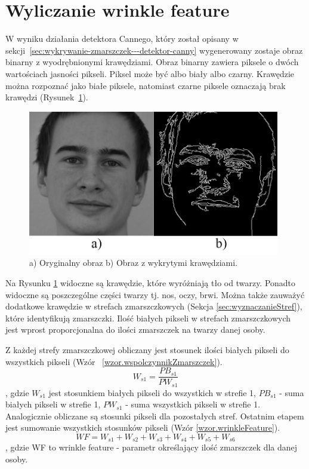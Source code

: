 \documentclass[a4paper,twoside,12pt]{book}
\begin{document}
    \section{Wyliczanie wrinkle feature}\label{sec:wyliczanieWrinkleFeature}
    W wyniku działania detektora Cannego, który został opisany w sekcji~\ref{sec:wykrywanie-zmarszczek---detektor-canny}
    wygenerowany zostaje obraz binarny z wyodrębnionymi krawędziami.
    Obraz binarny zawiera piksele o dwóch wartościach jasności pikseli.
    Piksel może być albo biały albo czarny.
    Krawędzie można rozpoznać jako białe piksele, natomiast czarne piksele oznaczają brak krawędzi (Rysunek~\ref{fig.mojaTwarzGray}).

    \begin{figure}
        \centering
        \includegraphics[width=11cm]{Obrazy/mojaTwarzGray.jpg}
        \caption{a) Oryginalny obraz b) Obraz z wykrytymi krawędziami.}
        \label{fig.mojaTwarzGray}
    \end{figure}

    Na Rysunku \ref{fig.mojaTwarzGray} widoczne są krawędzie, które wyróżniają tło od twarzy.
    Ponadto widoczne są poszczególne części twarzy tj. nos, oczy, brwi.
    Można także zauważyć dodatkowe krawędzie w strefach zmarszczkowych (Sekcja \ref{sec:wyznaczanieStref}),
    które identyfikują zmarszczki.
    Ilość białych pikseli w strefach zmarszczkowych jest wprost proporcjonalna do ilości zmarszczek na twarzy danej
    osoby.

    Z każdej strefy zmarszczkowej obliczany jest stosunek ilości białych pikseli do wszystkich
    pikseli (Wzór ~\ref{wzor.wspolczynnikZmarszczek}).
    \large
    \begin{equation}
        W_{s1} = \frac{PB_{s1}}{PW_{s1}}
        \label{wzor.wspolczynnikZmarszczek}
    \end{equation}
    \normalsize
    , gdzie $W_{s1}$ jest stosunkiem białych pikseli do wszystkich w strefie 1,
    $PB_{s1}$ - suma białych pikseli w strefie 1, $PW_{s1}$ - suma wszystkich pikseli w strefie 1.
    Analogicznie obliczane są stosunki pikseli dla pozostałych stref.
    Ostatnim etapem jest sumowanie wszystkich stosunków pikseli (Wzór \ref{wzor.wrinkleFeature}).
    \large
    \begin{equation}
        WF = W_{s1} + W_{s2} + W_{s3} + W_{s4} + W_{s5} + W_{s6}
        \label{wzor.wrinkleFeature}
    \end{equation}
    \normalsize
    , gdzie WF to wrinkle feature - parametr określający ilość zmarszczek dla danej osoby.
\end{document}
